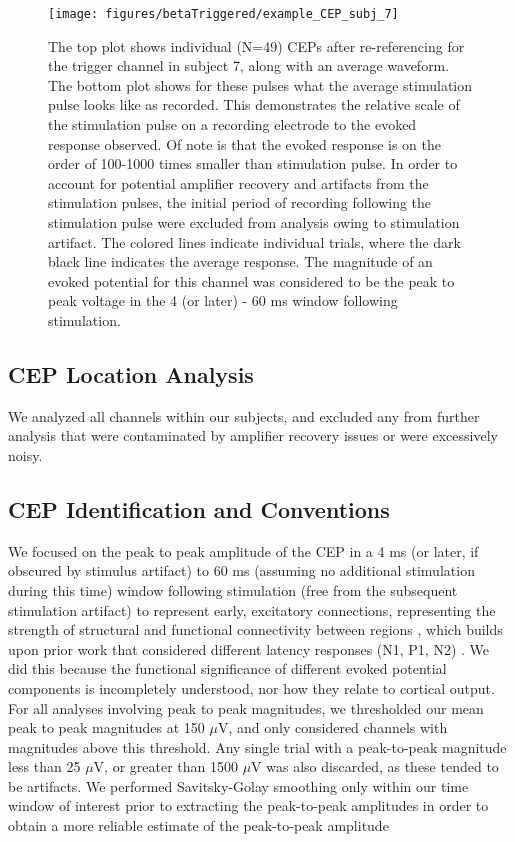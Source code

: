 \begin{figure}[ht]
	\centering
	\texttt{[image: figures/betaTriggered/example\_CEP\_subj\_7]}
	\caption[Characteristic Cortically Evoked Potentials and Stimulation Pulse ]{The top plot shows individual (N=49) CEPs after re-referencing for the trigger channel in subject 7, along with an average waveform. The bottom plot shows for these pulses what the average stimulation pulse looks like as recorded. This demonstrates the relative scale of the stimulation pulse on a recording electrode to the evoked response observed. Of note is that the evoked response is on the order of 100-1000 times smaller than stimulation pulse. In order to account for potential amplifier recovery and artifacts from the stimulation pulses, the initial period of recording following the stimulation pulse were excluded from analysis owing to stimulation artifact.  The colored lines indicate individual trials, where the dark black line indicates the average response. The magnitude of an evoked potential for this channel was considered to be the peak to peak voltage in the 4 (or later) - 60 ms window following stimulation.}
	\label{fig:betaStimExampleEP}
\end{figure}


\subsection{CEP Location Analysis}
We analyzed all channels within our subjects, and excluded any from further analysis that were contaminated by amplifier recovery issues or were excessively noisy. 

\subsection{CEP Identification and Conventions}
We focused on the peak to peak amplitude of the CEP in a 4 ms (or later, if obscured by stimulus artifact) to 60 ms (assuming no additional stimulation during this time) window following stimulation (free from the subsequent stimulation artifact) to represent early, excitatory connections, representing the strength of structural and functional connectivity between regions \cite{Keller2018}, which builds upon prior work that considered different latency responses (N1, P1, N2) \cite{Keller2014d,Entz2014b}. We did this because the functional significance of different evoked potential components is incompletely understood, nor how they relate to cortical output.   For all analyses involving peak to peak magnitudes, we thresholded our mean peak to peak magnitudes at 150 $\mu$V, and only considered channels with magnitudes above this threshold. Any single trial with a peak-to-peak magnitude less than 25 $\mu$V, or greater than 1500 $\mu$V was also discarded, as these tended to be artifacts. We performed Savitsky-Golay smoothing only within our time window of interest prior to extracting the peak-to-peak amplitudes in order to obtain a more reliable estimate of the peak-to-peak amplitude 

